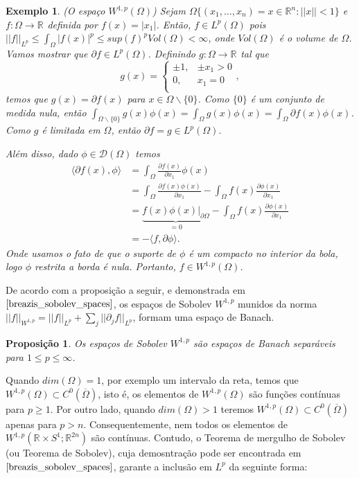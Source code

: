 \documentclass[12pt]{book}
\newtheorem{exemplo}[teorema]{Exemplo}
\newtheorem{proposicao}[teorema]{Proposição}
\newcommand{\circulo}{S^{1}}
\newcommand{\complementar}[2]{#1 \backslash #2}
\newcommand{\derivadaparcial}[2]{\frac{\partial #1}{\partial #2}}
\newcommand{\espacoLp}[1]{L^{p}(#1)}
\newcommand{\espacoLpGeral}[2]{L^{#1}(#2)}
\newcommand{\espacosobolev}[1]{W^{1,p}(#1)}
\newcommand{\espacosobolevcontradominio}[2]{W^{1,p}(#1;#2)}
\newcommand{\espacosobolevgeral}[2]{W^{1,#1}(#2)}
\newcommand{\funcaocond}[5]{
	#1 = 
	\left\{
	\begin{array}{cc}
		#2, & #3\\
		#4, & #5\\
	\end{array}
	\right.
}
\newcommand{\funcoesteste}{\mathcal{D}(\Omega)}
\newcommand{\norma}[1]{||#1||}
\newcommand{\normaLp}[1]{||#1||_{L^{p}}}
\newcommand{\normaWp}[1]{||#1||_{W^{1,p}}}
\newcommand{\produtointerno}[2]{\langle #1, #2 \rangle}
\newcommand{\retacartesianocirculo}{\real{} \times \circulo}
\newcommand{\real}[1]{\mathbb{R}^{#1}}
\newcommand{\reta}{\real{}}
\begin{document}
	\begin{exemplo}
		(O espaço $\espacosobolevgeral{p}{\Omega}$) Sejam $\Omega \{(x_{1}, \dots, x_{n})=x \in \real{n}: \norma{x}<1 \}$ e $f:\Omega\to \reta$ definida por $f(x) = |x_{1}|$. Então, $f \in \espacoLp{\Omega}$ pois $\normaLp{f} \leq \int_{\Omega}|f(x)|^{p} \leq sup(f)^{p}Vol(\Omega) <\infty$, onde $Vol(\Omega)$ é o volume de $\Omega$. Vamos mostrar que $\partial f \in \espacoLpGeral{p}{\Omega}$. Definindo $g:\Omega\to \reta$ tal que
		$$
		\funcaocond{g(x)}{\pm 1}{\pm x_{1}>0}{0}{x_{1} = 0},
		$$
		temos que $g(x) = \partial f(x)$ para $x \in \complementar{\Omega}{\{0\}}$. Como $\{0\}$ é um conjunto de medida nula, então $\int_{\complementar{\Omega}{\{0\}}}g(x)\phi(x) = \int_{\Omega}g(x)\phi(x) = \int_{\Omega}\partial f(x)\phi(x)$. Como $g$ é limitada em $\Omega$, então $\partial f =g \in \espacoLpGeral{p}{\Omega}$. 
		
		Além disso, dado $\phi \in \funcoesteste$ temos 
		$$
		\begin{aligned}
		\produtointerno{\partial f(x)}{\phi} 
		&= \int_{\Omega}\derivadaparcial{f(x)}{x_{1}}\phi(x)
		\\
		&= \int_{\Omega}\derivadaparcial{f(x)\phi(x)}{x_{1}}-\int_{\Omega}f(x)\derivadaparcial{\phi(x)}{x_{1}}
		\\
		&=\underbrace{f(x)\phi(x)\Big|_{\partial \Omega}}_{=0}-\int_{\Omega}f(x)\derivadaparcial{\phi(x)}{x_{1}}
		\\
		&=-\produtointerno{f}{\partial \phi}.
		\end{aligned}
		$$
		Onde usamos o fato de que o suporte de $\phi$ é um compacto no interior da bola, logo $\phi$ restrita a borda é nula. Portanto, $f \in \espacosobolevgeral{p}{\Omega}$.
	\end{exemplo}
	
	De acordo com a proposição a seguir, e demonstrada em $\cite{breazis_sobolev_spaces}$, os espaços de Sobolev $W^{1,p}$ munidos da norma $\normaWp{f} = \normaLp{f}+\sum_{j}\normaLp{\partial_{j} f}$, formam uma espaço de Banach.
	
	
	
	\begin{proposicao}
		Os espaços de Sobolev $W^{1,p}$ são espaços de Banach separáveis para $1\leq p \leq \infty$.
	\end{proposicao}
	
	Quando $dim(\Omega) = 1$, por exemplo um intervalo da reta, temos que $\espacosobolev{\Omega} \subset C^{0}(\overline{\Omega})$, isto é, os elementos de $\espacosobolev{\Omega}$ são funções contínuas para $p \geq 1$. Por outro lado, quando $dim(\Omega)>1$ teremos $\espacosobolev{\Omega} \subset C^{0}(\overline{\Omega})$ apenas para $p>n$. Consequentemente, nem todos os elementos de  $\espacosobolevcontradominio{\retacartesianocirculo}{\real{2n}}$  são contínuas. Contudo, o Teorema de mergulho de Sobolev (ou Teorema de Sobolev), cuja demosntração pode ser encontrada em $\cite{breazis_sobolev_spaces}$, garante a inclusão em $L^{p}$ da seguinte forma:
	
\end{document}

